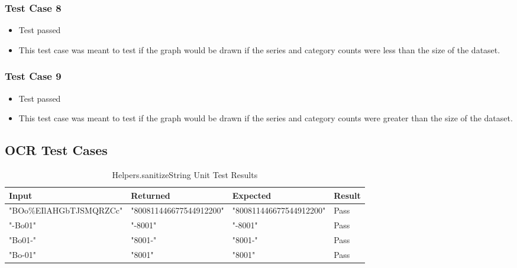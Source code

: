 \documentclass[a4paper,12pt]{article}
\begin{document}
\subsubsection{Test Case 8}
\begin{itemize}
	\item Test passed
	\item This test case was meant to test if the graph would be drawn if the series and category counts were less than the size of the dataset.
\end{itemize}
\subsubsection{Test Case 9}
\begin{itemize}
	\item Test passed
	\item This test case was meant to test if the graph would be drawn if the series and category counts were greater than the size of the dataset.
\end{itemize}

\subsection{OCR Test Cases}	
\begin{table}[h]
\centering

\label{my-label}
	\begin{adjustbox}{width=1\textwidth}
	\begin{tabular}{|l|l|l|l|}
	\hline
		\textbf{Input}         & \textbf{Returned}       & \textbf{Expected}       & \textbf{Result} \\ \hline
		"BOo\%EIlAHGbTJSMQRZCc" & "800811446677544912200" & "800811446677544912200" & Pass            \\ \hline
		"-Bo01"                 & "-8001"                 & "-8001"                 & Pass            \\ \hline
		"Bo01-"                 & "8001-"                 & "8001-"                 & Pass            \\ \hline
		"Bo-01"                 & "8001"                  & "8001"                  & Pass           \\ \hline 
	\end{tabular}
	\end{adjustbox}
	\caption{Helpers.sanitizeString Unit Test Results}		
\end{table}
\end{document}

